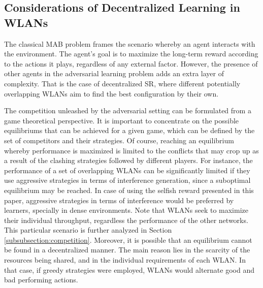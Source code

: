 \documentclass{article}
\begin{document}
\subsection{Considerations of Decentralized Learning in WLANs}
\label{subsection:considerations}
The classical MAB problem frames the scenario whereby an agent interacts with the environment. The agent's goal is to maximize the long-term reward according to the actions it plays, regardless of any external factor. However, the presence of other agents in the adversarial learning problem adds an extra layer of complexity. That is the case of decentralized SR, where different potentially overlapping WLANs aim to find the best configuration by their own. 

The competition unleashed by the adversarial setting can be formulated from a game theoretical perspective. It is important to concentrate on the possible equilibriums that can be achieved for a given game, which can be defined by the set of competitors and their strategies. Of course, reaching an equilibrium whereby performance is maximized is limited to the conflicts that may crop up as a result of the clashing strategies followed by different players. For instance, the performance of a set of overlapping WLANs can be significantly limited if they use aggressive strategies in terms of interference generation, since a suboptimal equilibrium may be reached. In case of using the selfish reward presented in this paper, aggressive strategies in terms of interference would be preferred by learners, specially in dense environments. Note that WLANs seek to maximize their individual throughput, regardless the performance of the other networks. This particular scenario is further analyzed in Section \ref{subsubsection:competition}. Moreover, it is possible that an equilibrium cannot be found in a decentralized manner. The main reason lies in the scarcity of the resources being shared, and in the individual requirements of each WLAN. In that case, if greedy strategies were employed, WLANs would alternate good and bad performing actions. 
	
\end{document}
